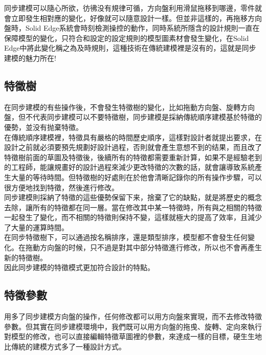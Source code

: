同步建模可以隨心所欲，彷彿没有規律可循，方向盤利用滑鼠拖移到哪邊，零件就會立即發生相對應的變化，好像就可以隨意設計一樣。但並非這樣的，再拖移方向盤時，Solid Edge系統會時刻檢測操控的動作，同時系統所隱含的設計規則一直在保障模型的變化，只符合和設定的設定規則的模型圖素材會發生變化，在Solid Edge中將此變化稱之為及時規則，這種技術在傳統建模裡是沒有的，這就是同步建模的魅力所在!\\

\subsection{特徵樹}

在同步建模的有些操作後，不會發生特徵樹的變化，比如拖動方向盤、旋轉方向盤，但不代表同步建模可以不要特徵樹，同步建模是採納傳統順序建模基於特徵的優勢，並没有抛棄特徵。\\

在傳統順序建模裡，特徵具有嚴格的時間歷史順序，這樣對設計者就提出要求，在設計之前就必須要預先規劃好設計過程，否則就會產生意想不到的结果，而且改了特徵樹前面的草圖及特徵後，後續所有的特徵都需要重新計算，如果不是經驗老到的工程師，能讓規畫好的設計過程來減少更改特徵的次數的話，就會讓導致系統產生大量的等待時間。但特徵樹的好處則在於他會清晰記錄你的所有操作步驟，可以很方便地找到特徵，然後進行修改。\\

同步建模則採納了特徵的這些優勢保留下来，捨棄了它的缺點，就是將歷史的概念去除，讓所有的特徵都在同一層。當在修改其中某一特徵時，所有與之相關的特徵一起發生了變化，而不相關的特徵則保持不變，這樣就極大的提高了效率，且減少了大量的運算時間。 \\

在同步特徵樹下，可以通過按名稱排序，還是類型排序，模型都不會發生任何變化。在拖動方向盤的时候，只不過是對其中部分特徵進行修改，所以也不會再產生新的特徵樹。\\

因此同步建模的特徵模式更加符合設計的特點。\\

\subsection{特徵參數}

用多了同步建模方向盤的操作，任何修改都可以用方向盤來實現，而不去修改特徵參數。但其實在同步建模環境中，我們既可以用方向盤的拖曵、旋轉、定向來執行對模型的修改，也可以直接編輯特徵草圖裡的參數，來達成一樣的目標，硬生生地比傳統的建模方式多了一種設計方式。\\

